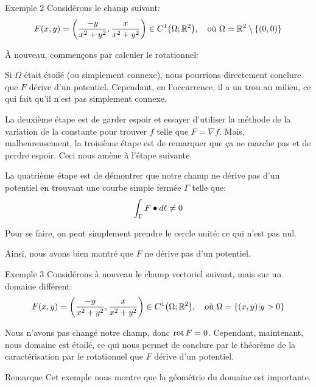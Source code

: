 \documentclass[a4paper]{article}
\begin{document}
\begin{parag}{Exemple 2}
    Considérons le champ suivant: 
    \[F\left(x, y\right) = \left(\frac{-y}{x^2 + y^2}, \frac{x}{x^2 + y^2}\right) \in C^1\left(\Omega; \mathbb{R}^2\right), \mathspace \text{où } \Omega = \mathbb{R}^2 \setminus \left\{\left(0, 0\right)\right\}\]

    À nouveau, commençons par calculer le rotationnel: 
    
    Si $\Omega$ était étoilé (ou simplement connexe), nous pourrions directement conclure que $F$ dérive d'un potentiel. Cependant, en l'occurrence, il a un trou au milieu, ce qui fait qu'il n'est pas simplement connexe.
    
    La deuxième étape est de garder espoir et essayer d'utiliser la méthode de la variation de la constante pour trouver $f$ telle que $F = \nabla f$. Mais, malheureusement, la troisième étape est de remarquer que ça ne marche pas et de perdre espoir. Ceci nous amène à l'étape suivante.

    La quatrième étape est de démontrer que notre champ ne dérive pas d'un potentiel en trouvant une courbe simple fermée $\Gamma$ telle que: 
    \[\int_{\Gamma} F \bullet d \ell \neq 0\]
    
    Pour se faire, on peut simplement prendre le cercle unité: 
    ce qui n'est pas nul.
    
    Ainsi, nous avons bien montré que $F$ ne dérive pas d'un potentiel.
\end{parag}

\begin{parag}{Exemple 3}
    Considérons à nouveau le champ vectoriel suivant, mais sur un domaine différent:
    \[F\left(x, y\right) = \left(\frac{-y}{x^2 + y^2}, \frac{x}{x^2 + y^2}\right) \in C^1\left(\Omega; \mathbb{R}^2\right), \mathspace \text{où } \Omega = \left\{\left(x, y\right) | y > 0\right\}\]

    Nous n'avons pas changé notre champ, donc $\operatorname{rot} F = 0$. Cependant, maintenant, nous domaine est étoilé, ce qui nous permet de conclure par le théorème de la caractérisation par le rotationnel que $F$ dérive d'un potentiel.

    \begin{subparag}{Remarque}
        Cet exemple nous montre que la géométrie du domaine est importante.
    \end{subparag}
\end{parag}
\end{document}
